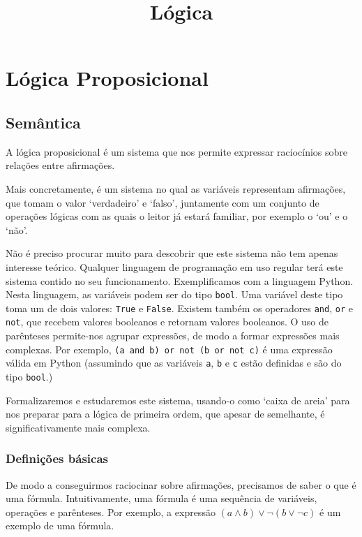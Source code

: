 \documentclass{report}
\title{Lógica}
\author{}
\date{}
\theoremstyle{definition}
\theoremstyle{remark}
\begin{document}
	\maketitle
	\newpage
	
	\tableofcontents
	\newpage
	
	\chapter{Lógica Proposicional}
	
	\section{Semântica}
	
	A lógica proposicional é um sistema que nos permite expressar raciocínios sobre relações entre afirmações.
	
	Mais concretamente, é um sistema no qual as variáveis representam afirmações, que tomam o valor `verdadeiro' e `falso', juntamente com um conjunto de operações lógicas com as quais o leitor já estará familiar, por exemplo o `ou' e o `não'.
	
	Não é preciso procurar muito para descobrir que este sistema não tem apenas interesse teórico. Qualquer linguagem de programação em uso regular terá este sistema contido no seu funcionamento. Exemplificamos com a linguagem Python. Nesta linguagem, as variáveis podem ser do tipo \texttt{bool}. Uma variável deste tipo toma um de dois valores: \texttt{True} e \texttt{False}. Existem também os operadores \texttt{and}, \texttt{or} e \texttt{not}, que recebem valores booleanos e retornam valores booleanos. O uso de parênteses permite-nos agrupar expressões, de modo a formar expressões mais complexas. Por exemplo, \texttt{(a and b) or not (b or not c)} é uma expressão válida em Python (assumindo que as variáveis \texttt{a}, \texttt{b} e \texttt{c} estão definidas e são do tipo \texttt{bool}.)
	
	Formalizaremos e estudaremos este sistema, usando-o como `caixa de areia' para nos preparar para a lógica de primeira ordem, que apesar de semelhante, é significativamente mais complexa.
	
	\subsection{Definições básicas}
	
	De modo a conseguirmos raciocinar sobre afirmações, precisamos de saber o que é uma fórmula. Intuitivamente, uma fórmula é uma sequência de variáveis, operações e parênteses. Por exemplo, a expressão $(a \land b) \lor \neg (b \lor \neg c)$ é um exemplo de uma fórmula.
	
\end{document}

